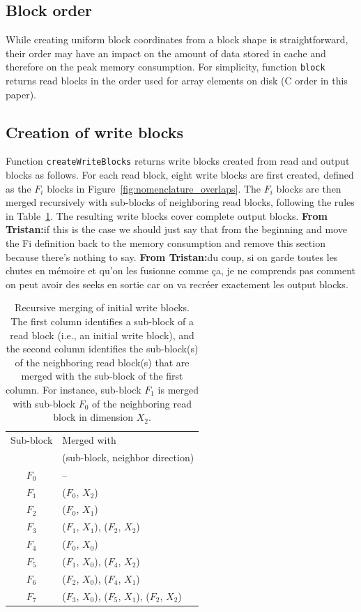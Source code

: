 \documentclass[sigconf, nonacm]{acmart}
\newcommand{\tristan}[1]{\color{orange}\textbf{From Tristan:}#1\color{black}}
\begin{document}
\subsection{Block order}

While creating uniform block coordinates from a block shape is
straightforward, their order may have an impact on the amount of data
stored in cache and therefore on the peak memory consumption. For
simplicity, function \texttt{block} returns read blocks in the
order used for array elements on disk (C order in this paper).

\subsection{Creation of write blocks}

Function \texttt{createWriteBlocks} returns write blocks created from read and output blocks
as follows. For each read block,
eight write blocks are first created, defined as the $F_i$ blocks in
Figure~\ref{fig:nomenclature_overlaps}. The $F_i$ blocks are then merged
recursively with sub-blocks of neighboring read blocks, following the rules
in Table~\ref{tab:fusion}. The resulting write blocks cover complete output blocks. \tristan{if this is the case we should just
say that from the beginning and move the Fi definition back to the memory consumption and remove this section because there's nothing to say.}
\tristan{du coup, si on garde toutes les chutes en mémoire et qu'on les fusionne comme ça,
je ne comprends pas comment on peut avoir des seeks en sortie car on va recréer exactement les output blocks.}
\begin{table}
  \centering
  \caption{Recursive merging of initial write blocks. The first column
  identifies a sub-block of a read block (i.e., an initial write block),
  and the second column identifies the sub-block(s) of the neighboring read
  block(s) that are merged with the sub-block of the first column. For instance, sub-block $F_1$ is merged with sub-block $F_0$
  of the neighboring read block in dimension $X_2$.}
   \begin{tabular}{c|l}
   \rowcolor{black!25}
   Sub-block & Merged with \\
   \rowcolor{black!25}
             & (sub-block, neighbor direction) \\
   $F_0$     & -- \\
   \rowcolor{black!10}
   $F_1$     & ($F_0$, $X_2$) \\
   $F_2$     & ($F_0$, $X_1$) \\
   \rowcolor{black!10}
   $F_3$     & ($F_1$, $X_1$), ($F_2$, $X_2$) \\
   $F_4$     & ($F_0$, $X_0$) \\
   \rowcolor{black!10}
   $F_5$     & ($F_1$, $X_0$), ($F_4$, $X_2$)\\
   $F_6$     & ($F_2$, $X_0$), ($F_4$, $X_1$)\\
   \rowcolor{black!10}
   $F_7$     & ($F_3$, $X_0$), ($F_5$, $X_1$), ($F_2$, $X_2$)\\
   \end{tabular}
   \label{tab:fusion}
\end{table}
\end{document}
